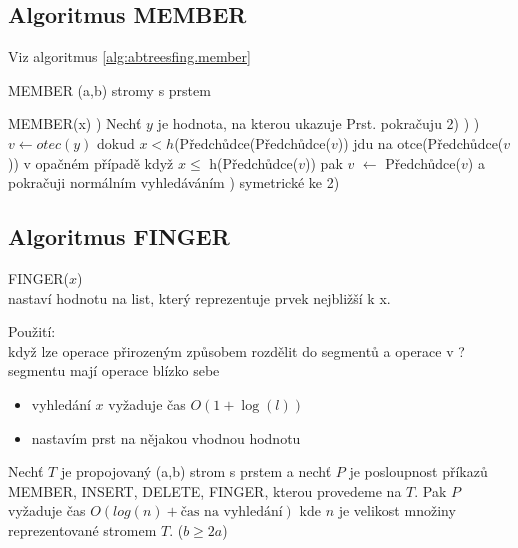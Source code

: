 \subsection{Algoritmus MEMBER}

Viz algoritmus \ref{alg:abtreesfing.member}


\begin{algorithm}[!htb]
\caption{MEMBER (a,b) stromy s prstem}
\label{alg:abtreesfing.member}
\begin{algorithmic}
\STATE MEMBER(x)
) Nechť $y$ je hodnota, na kterou ukazuje Prst.
    \STATE pokračuju 2)
  \ELSE
    )
  \ENDIF
{}) $v \leftarrow otec(y)$
  \STATE dokud $x < h$(Předchůdce(Předchůdce($v$))
   \STATE jdu na otce(Předchůdce($v$))
  \STATE v opačném případě
    \STATE když $x \leq$ h(Předchůdce($v$)) pak
    \STATE $v$ $\leftarrow$ Předchůdce($v$)
    \STATE a pokračuji normálním vyhledáváním
) symetrické ke 2)
\end{algorithmic}
\end{algorithm}

\subsection{Algoritmus FINGER}

FINGER($x$) \\
nastaví hodnotu na list, který reprezentuje prvek nejbližší k x.

Použití: \\
když lze operace přirozeným způsobem rozdělit do segmentů a operace v ?
segmentu mají operace blízko sebe
\par

\begin{itemize}
\item vyhledání $x$ vyžaduje čas $O(1 + \log(l))$
\item nastavím prst na nějakou vhodnou hodnotu
\end{itemize}

\begin{theorem}
Nechť $T$ je propojovaný (a,b) strom s prstem a nechť $P$ je posloupnost
příkazů MEMBER, INSERT, DELETE, FINGER, kterou provedeme na $T$.
Pak $P$ vyžaduje čas $O(log(n) + \text{čas na vyhledání})$
kde $n$ je velikost množiny reprezentované stromem $T$. ($b \geq 2a$)
\end{theorem}

